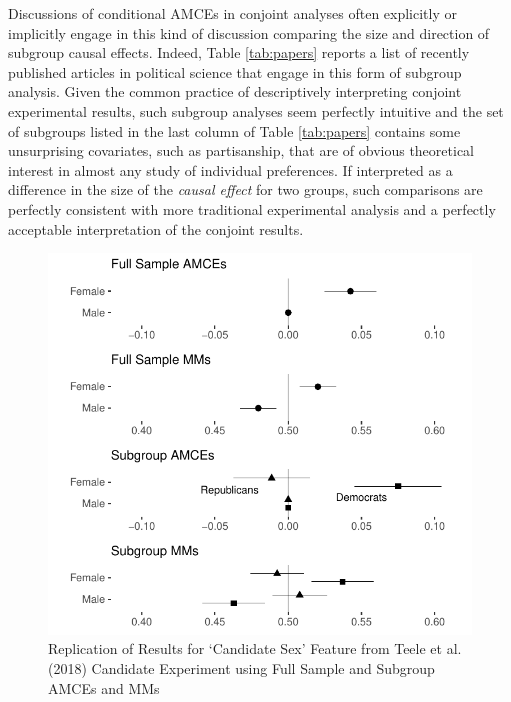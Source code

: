 \documentclass[a4paper,12pt]{article}\usepackage[]{graphicx}\usepackage[]{color}
\makeatletter
\def\maxwidth{ %
  \ifdim\Gin@nat@width>\linewidth
    \linewidth
  \else
    \Gin@nat@width
  \fi
}
\newenvironment{knitrout}{}{} %
\makeatother
\begin{document}
Discussions of conditional AMCEs in conjoint analyses often explicitly or implicitly engage in this kind of discussion comparing the size and direction of subgroup causal effects. Indeed, Table \ref{tab:papers} reports a list of recently published articles in political science that engage in this form of subgroup analysis. Given the common practice of descriptively interpreting conjoint experimental results, such subgroup analyses seem perfectly intuitive and the set of subgroups listed in the last column of Table \ref{tab:papers} contains some unsurprising covariates, such as partisanship, that are of obvious theoretical interest in almost any study of individual preferences. If interpreted as a difference in the size of the \textit{causal effect} for two groups, such comparisons are perfectly consistent with more traditional experimental analysis and a perfectly acceptable interpretation of the conjoint results.

\begin{knitrout}
\color{fgcolor}\begin{figure}
\includegraphics[width=\maxwidth]{figure/tkr_replication-1} \caption[Replication of Results for `Candidate Sex' Feature from Teele et al]{Replication of Results for `Candidate Sex' Feature from Teele et al. (2018) Candidate Experiment using Full Sample and Subgroup AMCEs and MMs}\label{fig:tkr_replication}
\end{figure}


\end{knitrout}
\end{document}
